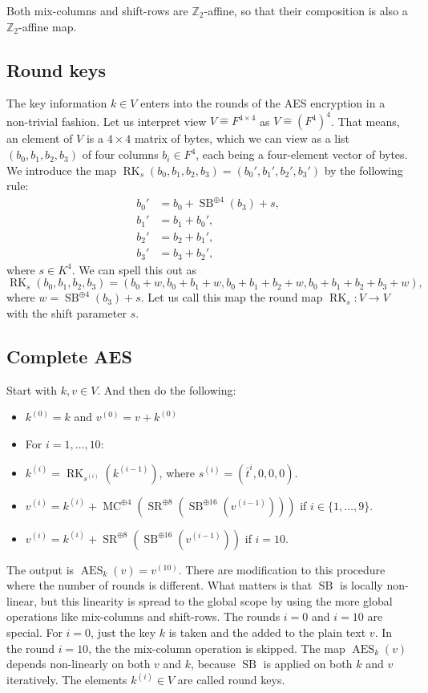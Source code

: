 \documentclass[11pt,a4paper]{amsart}
\newcommand{\AES}{\operatorname{AES}}
\newcommand{\SB}{\operatorname{SB}}
\newcommand{\SR}{\operatorname{SR}}
\newcommand{\MC}{\operatorname{MC}}
\newcommand{\RK}{\operatorname{RK}}
\newcommand{\Z}{\mathbb{Z}}
\begin{document}
Both mix-columns and shift-rows are $\Z_2$-affine, so that their composition is also a $\Z_2$-affine map. 

\subsection*{Round keys} The key information $k \in V $ enters into the rounds of the AES encryption in a non-trivial fashion. Let us interpret  view $V \hat{=} F^{4 \times 4}$ as $V \hat{=} (F^4)^4$. That means, an element of $V$ is a $4 \times 4$ matrix of bytes, which we can view as a list $(b_0,b_1,b_2,b_3)$ of four columns $b_i \in F^4$, each being a four-element vector of bytes. We introduce the map $\RK_s(b_0,b_1,b_2,b_3) = (b_0',b_1',b_2',b_3')$ by the following rule: 
\begin{align*} 
	b_0' & = b_0 + \SB^{\oplus 4} (b_3)  + s,
\\	b_1' & = b_1 + b_0', 
\\ b_2' & = b_2 + b_1',
\\ b_3' & = b_3 + b_2',
\end{align*} 
where $s \in K^4$. We can spell this out as 
\[
	\RK_s(b_0,b_1,b_2,b_3) = (b_0 + w, b_0 + b_1 + w, b_0 + b_1 + b_2 + w, b_0 + b_1 + b_2 + b_3 + w),
\]
where $w = \SB^{\oplus 4} (b_3) + s$. 
Let us call this map the round map $ \RK_s: V \to V$ with the shift parameter $s$. 

\subsection*{Complete AES} Start with $k ,v \in V$. And then do the following: 
\begin{itemize} 
\item $k^{(0)} = k$ and $v^{(0)} = v +k^{(0)}$
\item For $i=1,\ldots,10$: 
\item $k^{(i)} = \RK_{s^{(i)}}  (k^{(i-1)})$, where $s^{(i)} = (\bar{t}^i,0,0,0)$. 
\item $v^{(i)}  = k^{(i)} + \MC^{\oplus 4} (\SR^{\oplus 8}  ( \SB^{\oplus 16} (v^{(i-1)})))$ if $i  \in \{1,\ldots,9\}$. 
\item $v^{(i)}  = k^{(i)} + \SR^{\oplus 8}  ( \SB^{\oplus 16} (v^{(i-1)}))$ if $i=10$. 
\end{itemize} 
The output is $\AES_k(v) = v^{(10)} $. There are modification to this procedure where the number of rounds is different. What matters is that $\SB$ is locally non-linear, but this linearity is spread to the global scope by using the more global operations like mix-columns and shift-rows. The rounds $i=0$ and $i=10$ are special. For $i=0$, just the key $k$ is taken and the added to the plain text $v$. In the round $i=10$, the the mix-column operation is skipped. The map $\AES_k(v)$ depends non-linearly on both $v$ and $k$, because $\SB$ is applied on both $k$ and $v$ iteratively. The elements $k^{(i)} \in V$ are called round keys. 
\end{document}
